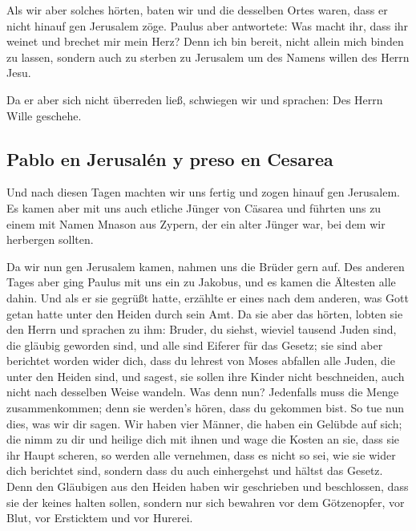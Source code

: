  Als wir aber solches hörten, baten wir und die desselben
Ortes waren, dass er nicht hinauf gen Jerusalem zöge. 
Paulus aber antwortete: Was macht ihr, dass ihr weinet und brechet mir
mein Herz? Denn ich bin bereit, nicht allein mich binden zu lassen,
sondern auch zu sterben zu Jerusalem um des Namens willen des Herrn
Jesu.

 Da er aber sich nicht überreden ließ, schwiegen wir und
sprachen: Des Herrn Wille geschehe.

\hypertarget{pablo-en-jerusaluxe9n-y-preso-en-cesarea}{%
\subsection{Pablo en Jerusalén y preso en
Cesarea}\label{pablo-en-jerusaluxe9n-y-preso-en-cesarea}}

 Und nach diesen Tagen machten wir uns fertig und zogen
hinauf gen Jerusalem.  Es kamen aber mit uns auch etliche
Jünger von Cäsarea und führten uns zu einem mit Namen Mnason aus Zypern,
der ein alter Jünger war, bei dem wir herbergen sollten.

 Da wir nun gen Jerusalem kamen, nahmen uns die Brüder
gern auf.  Des anderen Tages aber ging Paulus mit uns ein
zu Jakobus, und es kamen die Ältesten alle dahin.  Und
als er sie gegrüßt hatte, erzählte er eines nach dem anderen, was Gott
getan hatte unter den Heiden durch sein Amt.  Da sie aber
das hörten, lobten sie den Herrn und sprachen zu ihm: Bruder, du siehst,
wieviel tausend Juden sind, die gläubig geworden sind, und alle sind
Eiferer für das Gesetz;  sie sind aber berichtet worden
wider dich, dass du lehrest von Moses abfallen alle Juden, die unter den
Heiden sind, und sagest, sie sollen ihre Kinder nicht beschneiden, auch
nicht nach desselben Weise wandeln.  Was denn nun?
Jedenfalls muss die Menge zusammenkommen; denn sie werden's hören, dass
du gekommen bist.  So tue nun dies, was wir dir sagen.
 Wir haben vier Männer, die haben ein Gelübde auf sich;
die nimm zu dir und heilige dich mit ihnen und wage die Kosten an sie,
dass sie ihr Haupt scheren, so werden alle vernehmen, dass es nicht so
sei, wie sie wider dich berichtet sind, sondern dass du auch einhergehst
und hältst das Gesetz.  Denn den Gläubigen aus den Heiden
haben wir geschrieben und beschlossen, dass sie der keines halten
sollen, sondern nur sich bewahren vor dem Götzenopfer, vor Blut, vor
Ersticktem und vor Hurerei.


